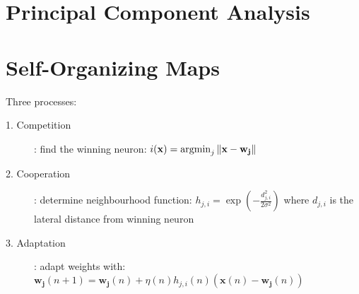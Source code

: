 \documentclass[11pt, twocolumn]{article}
\newcommand{\argmin}{\operatornamewithlimits{argmin}}
\begin{document}
\section{Principal Component Analysis}

\section{Self-Organizing Maps}
Three processes:
\begin{description}
	\item[1. Competition]: find the winning neuron: $i(\mathbf{x})=\argmin_j \Vert \mathbf{x}-\mathbf{w_j}\Vert$
	\item[2. Cooperation]: determine neighbourhood function: $h_{j,i} = \exp(-\frac{d_{j,i}^2}{2\sigma^2})$ \quad where $d_{j,i}$ is the lateral distance from winning neuron
	\item[3. Adaptation]: adapt weights with:\\
	$\mathbf{w_j}(n+1) = \mathbf{w_j}(n)+\eta(n)h_{j,i}(n)(\mathbf{x}(n)-\mathbf{w_j}(n))$
\end{description}
\end{document}
